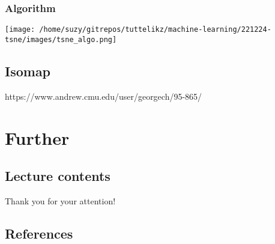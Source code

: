 \documentclass{beamer}
\begin{document}
    \begin{frame}
        \frametitle{Algorithm}
        \texttt{[image: /home/suzy/gitrepos/tuttelikz/machine-learning/221224-tsne/images/tsne\_algo.png]}
        
    \end{frame}

    \subsection{Isomap}
    \begin{frame}
        https://www.andrew.cmu.edu/user/georgech/95-865/        
    \end{frame}


    


    \nocite{*}




    \section{Further}
    \subsection{Lecture contents}
    \begin{frame}{}
      \begin{center}
      \begin{huge}Thank you for your attention!\end{huge}
      \end{center}
    \end{frame}
    \subsection{References}
\end{document}
